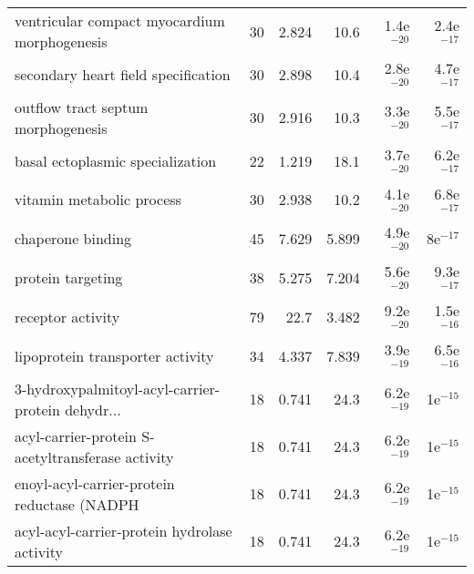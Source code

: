 \begin{longtable}{lrrrrr}
      ventricular compact myocardium morphogenesis &                      30 &                   2.824 &       10.6 &         1.4e$^{-20}$ &         2.4e$^{-17}$ \\
               secondary heart field specification &                      30 &                   2.898 &       10.4 &         2.8e$^{-20}$ &         4.7e$^{-17}$ \\
                outflow tract septum morphogenesis &                      30 &                   2.916 &       10.3 &         3.3e$^{-20}$ &         5.5e$^{-17}$ \\
                  basal ectoplasmic specialization &                      22 &                   1.219 &       18.1 &         3.7e$^{-20}$ &         6.2e$^{-17}$ \\
                         vitamin metabolic process &                      30 &                   2.938 &       10.2 &         4.1e$^{-20}$ &         6.8e$^{-17}$ \\
                                 chaperone binding &                      45 &                   7.629 &      5.899 &         4.9e$^{-20}$ &           8e$^{-17}$ \\
                                 protein targeting &                      38 &                   5.275 &      7.204 &         5.6e$^{-20}$ &         9.3e$^{-17}$ \\
                                 receptor activity &                      79 &                    22.7 &      3.482 &         9.2e$^{-20}$ &         1.5e$^{-16}$ \\
                  lipoprotein transporter activity &                      34 &                   4.337 &      7.839 &         3.9e$^{-19}$ &         6.5e$^{-16}$ \\
 3-hydroxypalmitoyl-acyl-carrier-protein dehydr... &                      18 &                   0.741 &       24.3 &         6.2e$^{-19}$ &           1e$^{-15}$ \\
 acyl-carrier-protein S-acetyltransferase activity &                      18 &                   0.741 &       24.3 &         6.2e$^{-19}$ &           1e$^{-15}$ \\
       enoyl-acyl-carrier-protein reductase (NADPH &                      18 &                   0.741 &       24.3 &         6.2e$^{-19}$ &           1e$^{-15}$ \\
      acyl-acyl-carrier-protein hydrolase activity &                      18 &                   0.741 &       24.3 &         6.2e$^{-19}$ &           1e$^{-15}$ \\

\end{longtable}
